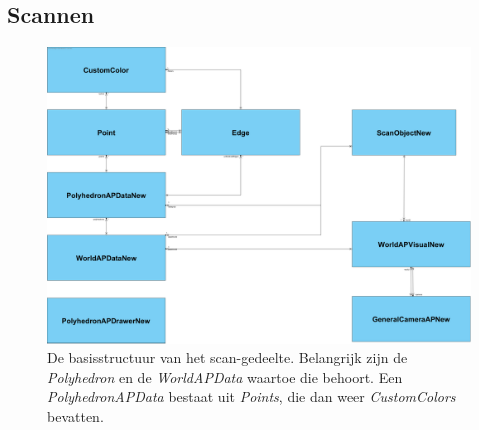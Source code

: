 \subsection{Scannen}
\begin{figure}[H]
		\begin{center}
			\includegraphics[width=1\linewidth]{Appendices/AP2.png}
		\end{center}
		\caption{De basisstructuur van het scan-gedeelte. Belangrijk zijn de \textit{Polyhedron} en de \textit{WorldAPData} waartoe die behoort. Een \textit{PolyhedronAPData} bestaat uit \textit{Points}, die dan weer \textit{CustomColors} bevatten. }
\end{figure}
